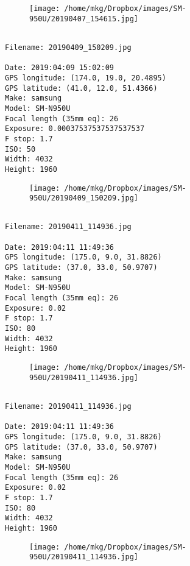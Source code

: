 \begin{figure}
\texttt{[image: /home/mkg/Dropbox/images/SM-950U/20190407\_154615.jpg]}
\end{figure}
    
\clearpage
\onecolumn
\noindent 
\noindent
\begin{lstlisting}

Filename: 20190409_150209.jpg

Date: 2019:04:09 15:02:09
GPS longitude: (174.0, 19.0, 20.4895)
GPS latitude: (41.0, 12.0, 51.4366)
Make: samsung
Model: SM-N950U
Focal length (35mm eq): 26
Exposure: 0.00037537537537537537
F stop: 1.7
ISO: 50
Width: 4032
Height: 1960
\end{lstlisting}
\clearpage

\begin{figure}
\texttt{[image: /home/mkg/Dropbox/images/SM-950U/20190409\_150209.jpg]}
\end{figure}
    
\clearpage
\onecolumn
\noindent 
\noindent
\begin{lstlisting}

Filename: 20190411_114936.jpg

Date: 2019:04:11 11:49:36
GPS longitude: (175.0, 9.0, 31.8826)
GPS latitude: (37.0, 33.0, 50.9707)
Make: samsung
Model: SM-N950U
Focal length (35mm eq): 26
Exposure: 0.02
F stop: 1.7
ISO: 80
Width: 4032
Height: 1960
\end{lstlisting}
\clearpage

\begin{figure}
\texttt{[image: /home/mkg/Dropbox/images/SM-950U/20190411\_114936.jpg]}
\end{figure}
    
\clearpage
\onecolumn
\noindent 
\noindent
\begin{lstlisting}

Filename: 20190411_114936.jpg

Date: 2019:04:11 11:49:36
GPS longitude: (175.0, 9.0, 31.8826)
GPS latitude: (37.0, 33.0, 50.9707)
Make: samsung
Model: SM-N950U
Focal length (35mm eq): 26
Exposure: 0.02
F stop: 1.7
ISO: 80
Width: 4032
Height: 1960
\end{lstlisting}
\clearpage

\begin{figure}
\texttt{[image: /home/mkg/Dropbox/images/SM-950U/20190411\_114936.jpg]}
\end{figure}
    